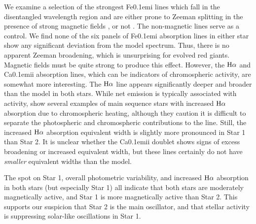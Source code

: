 We examine a selection of the strongest {\rm Fe}\kern 0.1em{\sc i} lines which fall in the disentangled wavelength region and are either prone to Zeeman splitting in the presence of strong magnetic fields \citep{har73}, or not \citep{sis70}. The non-magnetic lines serve as a control. We find none of the six panels of {\rm Fe}\kern 0.1em{\sc i} absorption lines in either star show any significant deviation from the model spectrum. Thus, there is no apparent Zeeman broadening, which is unsurprising for evolved red giants. Magnetic fields must be quite strong to produce this effect. However, the $\rm{H}\alpha$ and {\rm Ca}\kern 0.1em{\sc ii} absorption lines, which can be indicators of chromospheric activity, are somewhat more interesting. The $\rm{H}\alpha$ line appears significantly deeper and broader than the model in both stars. While net emission is typically associated with activity, \citet{rob90} show several examples of main sequence stars with increased $\rm{H}\alpha$ absorption due to chromospheric heating, although they caution it is difficult to separate the photospheric and chromospheric contributions to the line. Still, the increased $\rm{H}\alpha$ absorption equivalent width is slightly more pronounced in Star 1 than Star 2.  It is unclear whether the {\rm Ca}\kern 0.1em{\sc ii} doublet shows signs of excess broadening or increased equivalent width, but these lines certainly do not have \emph{smaller} equivalent widths than the model.

The spot on Star 1, overall photometric variability, and increased $\rm{H}\alpha$ absorption in both stars (but especially Star 1) all indicate that both stars are moderately magnetically active, and Star 1 is more magnetically active than Star 2. This supports our suspicion that Star 2 is the main oscillator, and that stellar activity is suppressing solar-like oscillations in Star 1.
